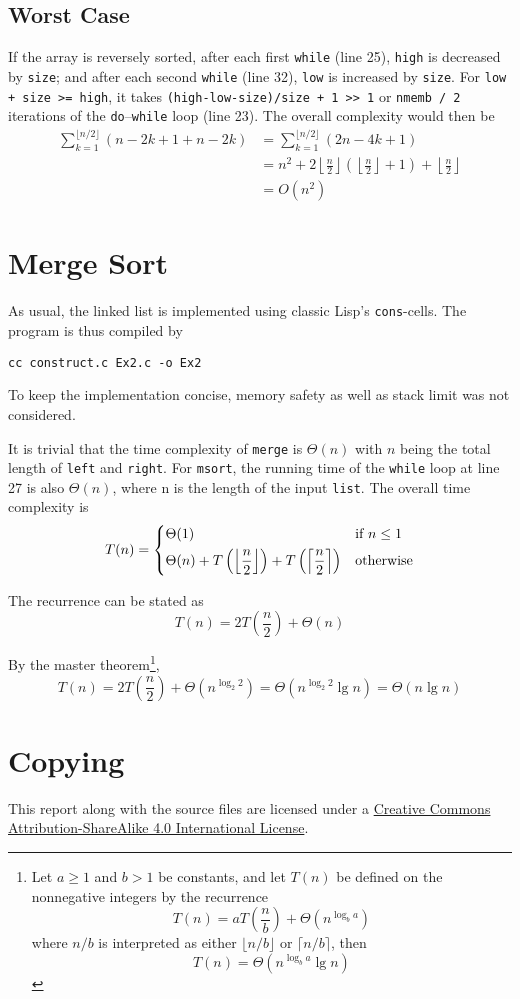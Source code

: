 \documentclass[a4paper,12pt]{article}
\begin{document}
\subsection{Worst Case}
If the array is reversely sorted, after each first \verb|while| (line 25),
\verb|high| is decreased by \verb|size|; and after each second
\verb|while| (line 32), \verb|low| is increased by \verb|size|.
For \verb|low + size >= high|, it takes \verb|(high-low-size)/size + 1 >> 1|
or \verb|nmemb / 2| iterations of the \verb|do|--\verb|while| loop (line 23).
The overall complexity would then be
\begin{align*}
  \sum_{k=1}^{\lfloor n/2\rfloor}(n - 2k + 1 + n - 2k)
  &= \sum_{k=1}^{\lfloor n/2\rfloor}(2n - 4k + 1)\\
  &= n^2 + 2\left\lfloor\frac{n}{2}\right\rfloor
  \left(\left\lfloor\frac{n}{2}\right\rfloor + 1\right)
  + \left\lfloor\frac{n}{2}\right\rfloor\\
  &= O\left(n^2\right)
\end{align*}

\section{Merge Sort}
As usual, the linked list is implemented using classic Lisp's \verb|cons|-cells.
The program is thus compiled by
\begin{verbatim}
cc construct.c Ex2.c -o Ex2
\end{verbatim}

To keep the implementation concise, memory safety as well as stack limit
was not considered.

It is trivial that the time complexity of \verb|merge| is $\Theta(n)$ with
$n$ being the total length of \verb|left| and \verb|right|.  For \verb|msort|,
the running time of the \verb|while| loop at line 27 is also $\Theta(n)$, where
n is the length of the input \verb|list|.  The overall time complexity is
\[T(n) = \begin{dcases}
  \Theta(1) &\text{if }n \le 1\\
  \Theta(n) + T\left(\left\lfloor\frac{n}{2}\right\rfloor\right)
  + T\left(\left\lceil\frac{n}{2}\right\rceil\right) &\text{otherwise}
\end{dcases}\]

The recurrence can be stated as
\[T(n) = 2T\left(\frac{n}{2}\right) + \Theta(n)\]
\pagebreak

By the master theorem\footnote{Let $a \ge 1$ and $b > 1$ be constants,
and let $T(n)$ be defined on the nonnegative integers by the recurrence
\[T(n) = aT\left(\frac{n}{b}\right) + \Theta\left(n^{\log_b a}\right)\]
where $n/b$ is interpreted as either $\lfloor n/b\rfloor$ or $\lceil n/b\rceil$,
then \[T(n) = \Theta\left(n^{\log_b a}\lg n\right)\]},
\[T(n) = 2T\left(\frac{n}{2}\right) + \Theta\left(n^{\log_2 2}\right)
= \Theta\left(n^{\log_2 2}\lg n\right) = \Theta(n\lg n)\]

\section{Copying}
This report along with the source files are licensed under a
\href{https://creativecommons.org/licenses/by-sa/4.0/}{Creative Commons
Attribution-ShareAlike 4.0 International License}.
\end{document}
